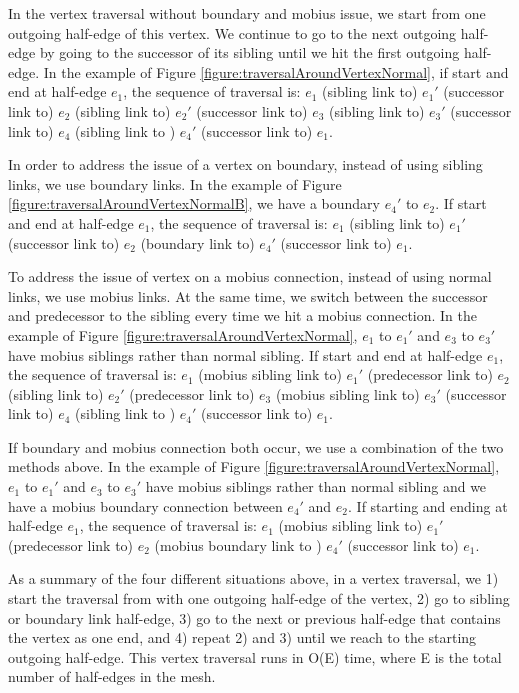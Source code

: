 \documentclass[12pt]{article}
\begin{document}
In the vertex traversal without boundary and mobius issue, we start from one outgoing half-edge of this vertex. We continue to go to the next outgoing half-edge by going to the successor of its sibling until we hit the first outgoing half-edge. In the example of Figure \ref{figure:traversalAroundVertexNormal}, if start and end at half-edge $e_1$, the sequence of traversal is: $e_1$ (sibling link to) $e_1'$ (successor link to) $e_2$ (sibling link to) $e_2'$ (successor link to) $e_3$ (sibling link to) $e_3'$ (successor link to) $e_4$ (sibling link to ) $e_4'$  (successor link to)  $e_1$.

In order to address the issue of a vertex on boundary, instead of using sibling links, we use boundary links. In the example of Figure \ref{figure:traversalAroundVertexNormalB}, we have a boundary $e_4'$ to $e_2$. If start and end at half-edge $e_1$, the sequence of traversal is: $e_1$ (sibling link to) $e_1'$ (successor link to) $e_2$ (boundary link to) $e_4'$ (successor link to)  $e_1$.

To address the issue of vertex on a mobius connection, instead of using normal links, we use mobius links. At the same time, we switch between the successor and predecessor to the sibling every time we hit a mobius connection.  In the example of Figure \ref{figure:traversalAroundVertexNormal}, $e_1$ to $e_1'$ and $e_3$ to $e_3'$ have mobius siblings rather than normal sibling. If start and end at half-edge $e_1$, the sequence of traversal is: $e_1$ (mobius sibling link to) $e_1'$ (predecessor link to) $e_2$ (sibling link to) $e_2'$ (predecessor link to) $e_3$ (mobius sibling link to) $e_3'$ (successor link to) $e_4$ (sibling link to ) $e_4'$  (successor link to)  $e_1$.

If boundary and mobius connection both occur, we use a combination of the two methods above. In the example of Figure \ref{figure:traversalAroundVertexNormal}, $e_1$ to $e_1'$ and $e_3$ to $e_3'$ have mobius siblings rather than normal sibling and we have a mobius boundary connection between $e_4'$ and $e_2$. If starting and ending at half-edge $e_1$, the sequence of traversal is: $e_1$ (mobius sibling link to) $e_1'$ (predecessor link to) $e_2$ (mobius boundary link to ) $e_4'$  (successor link to)  $e_1$.

As a summary of the four different situations above, in a vertex traversal, we 1) start the traversal from with one outgoing half-edge of the vertex, 2) go to sibling or boundary link half-edge, 3) go to the next or previous half-edge that contains the vertex as one end, and 4) repeat 2) and 3) until we reach to the starting outgoing half-edge. This vertex traversal runs in O(E) time, where E is the total number of half-edges in the mesh.
\end{document}
